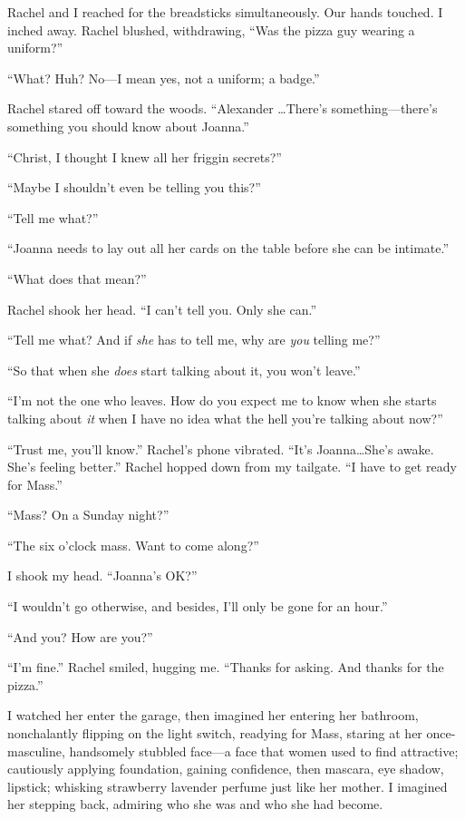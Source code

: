 Rachel and I reached for the breadsticks simultaneously. Our hands
touched. I inched away. Rachel blushed, withdrawing, ``Was the pizza guy
wearing a uniform?''

``What? Huh? No---I mean yes, not a uniform; a badge.''

Rachel stared off toward the woods. ``Alexander \ldots There's
some\-thing---there's something you should know about Joanna.''

``Christ, I thought I knew all her friggin secrets?''

``Maybe I shouldn't even be telling you this?''

``Tell me what?''

``Joanna needs to lay out all her cards on the table before she can be
intimate.''

``What does that mean?''

Rachel shook her head. ``I can't tell you. Only she can.''

``Tell me what? And if \emph{she} has to tell me, why are \emph{you}
telling me?''

``So that when she \emph{does} start talking about it, you won't
leave.''

``I'm not the one who leaves. How do you expect me to know when she
starts talking about \emph{it} when I have no idea what the hell you're
talking about now?''

``Trust me, you'll know.'' Rachel's phone vibrated. ``It's
Joanna\ldots \linebreak She's awake. She's feeling better.'' Rachel hopped down
from my tailgate. ``I have to get ready for Mass.''

``Mass? On a Sunday night?''

``The six o'clock mass. Want to come along?''

I shook my head. ``Joanna's OK?''

``I wouldn't go otherwise, and besides, I'll only be gone for an hour.''

``And you? How are you?''

``I'm fine.'' Rachel smiled, hugging me. ``Thanks for asking. And thanks
for the pizza.''

I watched her enter the garage, then imagined her entering her bathroom,
nonchalantly flipping on the light switch, readying for Mass, staring at
her once-masculine, handsomely stubbled face---a face that women used to
find attractive; cautiously applying foundation, gaining confidence,
then mascara, eye shadow, lipstick; whisking strawberry lavender perfume
just like her mother. I imagined her stepping back, admiring who she was
and who she had become.

